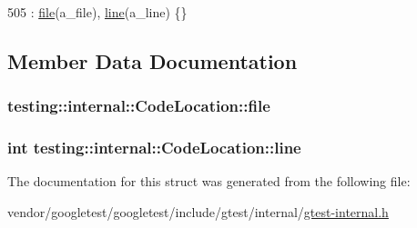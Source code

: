 \begin{DoxyCode}
505 : \hyperlink{structtesting_1_1internal_1_1CodeLocation_ab8a24d5e63295e411d37578dbb9427c0}{file}(a\_file), \hyperlink{structtesting_1_1internal_1_1CodeLocation_a01c977c7e8834a05a6d6c40b0c416045}{line}(a\_line) \{\}
\end{DoxyCode}


\subsection{Member Data Documentation}
\subsubsection[{\texorpdfstring{file}{file}}]{ testing\+::internal\+::\+Code\+Location\+::file}\hypertarget{structtesting_1_1internal_1_1CodeLocation_ab8a24d5e63295e411d37578dbb9427c0}{}\label{structtesting_1_1internal_1_1CodeLocation_ab8a24d5e63295e411d37578dbb9427c0}
\subsubsection[{\texorpdfstring{line}{line}}]{\setlength{\rightskip}{0pt plus 5cm}int testing\+::internal\+::\+Code\+Location\+::line}\hypertarget{structtesting_1_1internal_1_1CodeLocation_a01c977c7e8834a05a6d6c40b0c416045}{}\label{structtesting_1_1internal_1_1CodeLocation_a01c977c7e8834a05a6d6c40b0c416045}


The documentation for this struct was generated from the following file\+:\begin{DoxyCompactItemize}
\item 
vendor/googletest/googletest/include/gtest/internal/\hyperlink{gtest-internal_8h}{gtest-\/internal.\+h}\end{DoxyCompactItemize}
